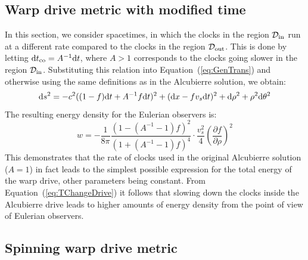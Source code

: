 \documentclass[10pt]{iopart}
\begin{document}
\subsection{Warp drive metric with modified time}
In this section, we consider spacetimes, in which the clocks in the region $\mathcal{D}_{\rm in}$ run at a different rate compared to the clocks in the region $\mathcal{D}_{\rm out}$. This is done by letting ${\rm d}t_{\rm co}=A^{-1}{\rm d}t$, where $A>1$ corresponds to the clocks going slower in the region $\mathcal{D}_{\rm in}$. Substituting this relation into Equation~(\ref{eq:GenTrans}) and otherwise using the same definitions as in the Alcubierre solution, we obtain:
\begin{equation}
    {\rm d}s^2=-c^2 ((1-f){\rm d} t + A^{-1}f{\rm d} t)^2 + ({\rm d}x-f v_s {\rm d}t)^2 + {\rm d}\rho^2 + \rho^2{\rm d}\theta^2
    \label{eq:AlcV}
\end{equation}
The resulting energy density for the Eulerian observers is:
\begin{equation}
    w=-\frac{1}{8\pi}\frac{ (1-(A^{-1}-1)f)^2}{(1+(A^{-1}-1)f)^4}\cdot\frac{v_s^2}{4}\left(\frac{{\partial} f}{{\partial} \rho}\right)^2
    \label{eq:TChangeDrive}
\end{equation}
This demonstrates that the rate of clocks used in the original Alcubierre solution ($A=1$) in fact leads to the simplest possible expression for the total energy of the warp drive, other parameters being constant. From Equation~(\ref{eq:TChangeDrive}) it follows that slowing down the clocks inside the Alcubierre drive leads to higher amounts of energy density from the point of view of Eulerian observers.


\subsection{Spinning warp drive metric}
\end{document}
